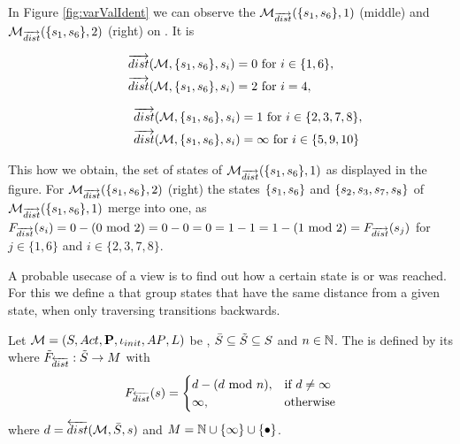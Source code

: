 \documentclass[preview]{standalone}
\begin{document}
In Figure \ref{fig:varValIdent} we can observe the \viewsN ${{{{{\mathcal{M}}}}_{{{\overrightarrow{dist}}}}}}(\{{s}_1, {s}_6\}, 1)$ (middle) and ${{{{{\mathcal{M}}}}_{{{\overrightarrow{dist}}}}}}(\{{s}_1, {s}_6\}, 2)$ (right) on \chgph. It is


\begin{minipage}{.4\textwidth}
	\begin{align*}
		\hspace{-10mm}
		\distpath(\chgph, \{\state_1, \state_6\}, \state_i) &= 0 \text{ for } i \in \{1,6\},\\
		\distpath(\chgph, \{\state_1, \state_6\}, \state_i) &= 2 \text{ for } i = 4,
	\end{align*}	
\end{minipage}
\begin{minipage}{.5\textwidth}
	\begin{align*}
		\hspace{10mm}
	 	\distpath(\chgph, \{\state_1, \state_6\}, \state_i) &= 1 \text{ for } i \in \{2,3,7,8\},\\
		\distpath(\chgph, \{\state_1, \state_6\}, \state_i) &= \infty \text{ for } i \in \{5,9,10\}
	\end{align*}
\end{minipage}


This how we obtain, the set of states of ${{{{{\mathcal{M}}}}_{{{\overrightarrow{dist}}}}}}(\{{s}_1, {s}_6\}, 1)$ as displayed in the figure. For ${{{{{\mathcal{M}}}}_{{{\overrightarrow{dist}}}}}}(\{{s}_1, {s}_6\}, 2)$ (right) the states $\{{s}_1, {s}_6\}$ and $\{{s}_2, {s}_3, {s}_7, {s}_8\}$ of ${{{{{\mathcal{M}}}}_{{{\overrightarrow{dist}}}}}}(\{{s}_1, {s}_6\}, 1)$ merge into one, as ${{F_{{{\overrightarrow{dist}}}}}}({s}_i) = 0 - (0 \text{ mod } 2) = 0 - 0 = 0 = 1 - 1 =1 - (1 \text{ mod } 2) = {{F_{{{\overrightarrow{dist}}}}}}({s}_j)$ for $j \in \{1,6\}$ and $i \in \{2,3,7,8\}$.

A probable usecase of a view is to find out how a certain state is or was reached. For this we define a \viewN that group states that have the same distance from a given state, when only traversing transitions backwards.

\begin{definition}
	Let ${{{\mathcal{M}}}} = {{({S}, {Act}, {\textbf{P}}, {\iota_{init}}, {AP}, {L})}}$ be \achgphN, $\bar{{S}} \subseteq {\tilde{\ensuremath{{S}}}} \subseteq {S}$ and $n \in {\mathbb{N}}$. The \viewN \viewdistancerev is defined by its \grpfctN \gfctdistancerev where ${{\tilde{F}_{{{\overleftarrow{dist}}}}}} : {\tilde{{S}}} \to {\ensuremath{{M}}}$ with 
	\[
	{{F_{{{\overleftarrow{dist}}}}}}({s}) =
	\begin{cases}
		{d} - ({d} \text{ mod } n), &\text{if } d \neq \infty \\
		\infty, &\text{otherwise}
	\end{cases}		
	\]
	where ${d} = {\overleftarrow{dist}}({{{\mathcal{M}}}},\bar{{S}}, {s})$ and $\imggrp = \natnums \cup \{\infty\} \cup \remset$.
\end{definition}
\end{document}
